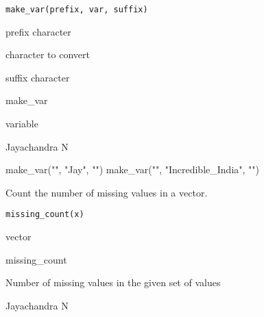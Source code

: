 \documentclass[a4paper]{book}
\begin{document}
%
\begin{Usage}
\begin{verbatim}
make_var(prefix, var, suffix)
\end{verbatim}
\end{Usage}
%
\begin{Arguments}
\begin{ldescription}
\item[\code{prefix}] prefix character

\item[\code{var}] character to convert

\item[\code{suffix}] suffix character
\end{ldescription}
\end{Arguments}
%
\begin{Details}\relax
make\_var
\end{Details}
%
\begin{Value}
variable
\end{Value}
%
\begin{Author}\relax
Jayachandra N
\end{Author}
%
\begin{Examples}
\begin{ExampleCode}
make_var("", "Jay", "")
make_var("", "Incredible_India", "")
\end{ExampleCode}
\end{Examples}
%
\begin{Description}\relax
Count the number of missing values in a vector.
\end{Description}
%
\begin{Usage}
\begin{verbatim}
missing_count(x)
\end{verbatim}
\end{Usage}
%
\begin{Arguments}
\begin{ldescription}
\item[\code{x}] vector
\end{ldescription}
\end{Arguments}
%
\begin{Details}\relax
missing\_count
\end{Details}
%
\begin{Value}
Number of missing values in the given set of values
\end{Value}
%
\begin{Author}\relax
Jayachandra N
\end{Author}
\end{document}
